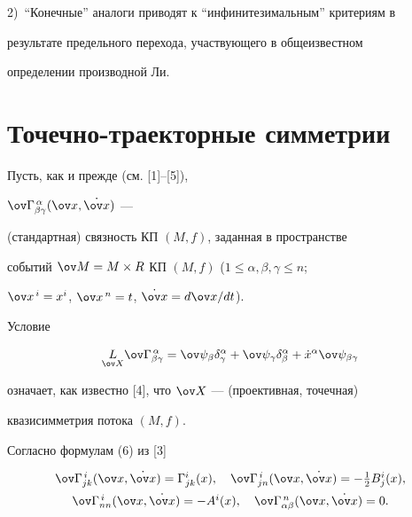2)~``Конечные'' аналоги приводят к ``инфинитезимальным'' критериям в 


результате предельного перехода, участвующего в общеизвестном 


определении производной Ли. 


 


\section{Точечно-траекторные симметрии} 


 


Пусть, как и прежде (см. [1]--[5]), 


$\ov\Gamma^{\,\alpha}_{\beta\gamma}(\ov x,\Dot{\ov x})$ --- 


(стандартная) связность КП $(M,f)$, заданная в пространстве 


событий $\ov M=M\times R$ КП $(M,f)$ ($1\le\alpha,\beta,\gamma\le n$; 


$\ov x^{\,i}=x^i$, $\ov x^{\,n}=t$, $\Dot{\ov x}=d\ov x/dt$). 


Условие 


\begin{equation} 


\down{\ov X}{L}\ov\Gamma^{\,\alpha}_{\beta\gamma}= 


\ov\psi_\beta\delta^\alpha_\gamma+ 


\ov\psi_\gamma\delta^\alpha_\beta+\Dot x^\alpha 


\ov\psi_{\beta\gamma} 


\end{equation} 


означает, как известно [4], что $\ov X$ --- (проективная, точечная) 


квазисимметрия потока $(M,f)$. 


Согласно формулам (6) из [3] 


\begin{equation} 


\begin{array}{c} 


\ov\Gamma^{\,i}_{j k}(\ov x,\Dot{\ov x})= 


\Gamma^i_{j k}(x),\quad \ov\Gamma^{\,i}_{j n}(\ov x,\Dot{\ov x})= 


-\tfrac{1}{2}B^i_j(x),\\[2mm] 


% 


\ov\Gamma^{\,i}_{n n}(\ov x,\Dot{\ov x})=-A^i(x),\quad 


\ov\Gamma^{\,n}_{\alpha\beta}(\ov x,\Dot{\ov x})=0. 


\end{array} 


\end{equation} 


